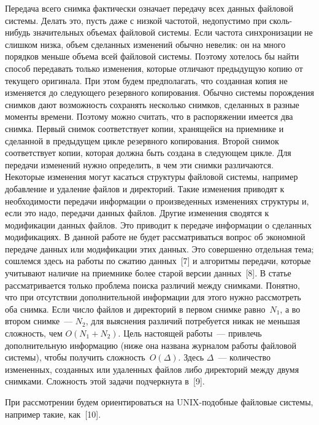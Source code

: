 \begin{multicols}{2}
      Передача всего снимка фактически означает передачу всех данных 
файловой системы. Делать это, пусть даже с низкой частотой, недопустимо при 
сколь-нибудь значительных объемах файловой сис\-те\-мы. Если частота  
синхронизации не слишком низка, объем сделанных изменений обычно 
невелик: он на много порядков меньше объема всей файловой сис\-те\-мы. 
Поэтому хотелось бы \mbox{найти} способ передавать только изменения, которые 
отличают предыдущую копию от текущего оригинала. При этом будем 
предполагать, что созданная копия не изменяется до следующего резервного 
копирования. Обычно сис\-те\-мы порождения снимков дают возможность 
сохранять несколько снимков, сделанных в разные моменты времени. Поэтому 
можно считать, что в распоряжении имеется два снимка. Первый снимок 
соответствует копии, хранящейся на приемнике и сделанной в предыдущем 
цикле резервного копирования. Второй снимок соответствует копии, которая 
должна быть создана в следующем цикле. Для передачи изменений нужно 
определить, в чем эти снимки различаются.  Некоторые изменения могут 
касаться структуры файловой сис\-те\-мы, например добавление и удаление 
файлов и директорий. Такие изменения приводят к необходимости передачи 
информации о произведенных изменениях структуры и, если это надо, 
передачи данных файлов.  Другие изменения сводятся к модификации данных 
файлов. Это приводит к передаче информации о сделанных модификациях. В 
данной работе не будет рассматриваться вопрос об экономной передаче данных 
или модификации этих данных. Это совершенно отдельная тема; сошлемся 
здесь на работы по сжатию данных~[7] и  алгоритмы передачи, которые 
учитывают наличие на приемнике более старой версии данных~[8]. В статье 
рассматривается только проблема поиска различий между снимками. Понятно, 
что при отсутствии дополнительной информации для этого нужно рассмотреть 
оба снимка. Если число файлов и директорий в первом снимке равно~$N_1$, а 
во втором снимке~--- $N_2$, для выяснения различий потребуется никак не 
меньшая сложность, чем $O(N_1+N_2)$. Цель настоящей работы~--- привлечь 
дополнительную информацию (ниже она названа журналом работы файловой 
сис\-те\-мы), чтобы получить сложность~$O(\Delta)$. Здесь $\Delta$~--- 
количество измененных, созданных или удаленных файлов либо директорий 
между двумя снимками. Сложность этой задачи подчеркнута в~[9].
      
      При рассмотрении будем ориентироваться на UNIX-подобные файловые 
системы, например такие, как~[10].

\vspace*{-5pt}


\end{multicols}
